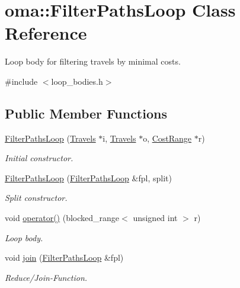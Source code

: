 \hypertarget{classoma_1_1_filter_paths_loop}{\section{oma\-:\-:Filter\-Paths\-Loop Class Reference}
\label{classoma_1_1_filter_paths_loop}
}


Loop body for filtering travels by minimal costs.  




{\ttfamily \#include $<$loop\-\_\-bodies.\-h$>$}

\subsection*{Public Member Functions}
\begin{DoxyCompactItemize}
\item 
\hyperlink{classoma_1_1_filter_paths_loop_ab5fd9762c48c2332e3711cec64bb0333}{Filter\-Paths\-Loop} (\hyperlink{types_8h_aef021ba284c03a12dddcfa082468e831}{Travels} $\ast$i, \hyperlink{types_8h_aef021ba284c03a12dddcfa082468e831}{Travels} $\ast$o, \hyperlink{class_cost_range}{Cost\-Range} $\ast$r)
\begin{DoxyCompactList}\small\item\em Initial constructor. \end{DoxyCompactList}\item 
\hyperlink{classoma_1_1_filter_paths_loop_a0d44a59b8aa54215b164dff19cfdd5ad}{Filter\-Paths\-Loop} (\hyperlink{classoma_1_1_filter_paths_loop}{Filter\-Paths\-Loop} \&fpl, split)
\begin{DoxyCompactList}\small\item\em Split constructor. \end{DoxyCompactList}\item 
void \hyperlink{classoma_1_1_filter_paths_loop_a0ed77288c258f6f3680f36a463fceb91}{operator()} (blocked\-\_\-range$<$ unsigned int $>$ r)
\begin{DoxyCompactList}\small\item\em Loop body. \end{DoxyCompactList}\item 
void \hyperlink{classoma_1_1_filter_paths_loop_af7fad40771cf7b556e087de9a66fb22b}{join} (\hyperlink{classoma_1_1_filter_paths_loop}{Filter\-Paths\-Loop} \&fpl)
\begin{DoxyCompactList}\small\item\em Reduce/\-Join-\/\-Function. \end{DoxyCompactList}\end{DoxyCompactItemize}


